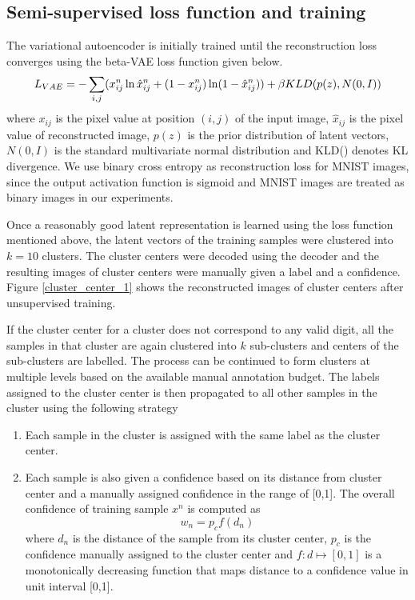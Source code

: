 \documentclass{bmvc2k}
\begin{document}
\subsection{Semi-supervised loss function and training}\label{section_loss_function}
The variational autoencoder is initially trained until the reconstruction loss converges using the beta-VAE loss function \cite{beta_vae} given below.
\begin{equation} \label{vae_loss_eqn}
L_{VAE} = -\sum_{i, j}(x_{ij}^n \ln \hat{x}_{ij}^n
+ (1 - x_{ij}^n) \ln(1 -  \hat{x}_{ij}^n ) )\\
    +\beta KLD(p(z), N(0,I))
\end{equation}
where   $x_{ij}$ is the pixel value at position $(i, j)$ of the input image, $\hat{x}_{ij}$ is the pixel value of reconstructed image, $p(z)$ is the prior distribution of latent vectors, $N(0,I)$ is the standard multivariate normal distribution and KLD() denotes KL divergence.
We use binary cross entropy as reconstruction loss for MNIST images, since the output activation function is sigmoid and MNIST images are treated as binary images in our experiments.

Once a reasonably good latent representation is learned using the loss function mentioned above, the latent vectors of the training samples were clustered into $k=10$ clusters.
The cluster centers were decoded using the decoder  and the resulting images of cluster centers were manually given a label and a confidence.
Figure \ref{cluster_center_1} shows the reconstructed images of cluster centers after unsupervised training.


If the cluster center for a cluster does not correspond to any valid digit, all the samples in that cluster are again clustered into $k$ sub-clusters and  centers of the sub-clusters are labelled.
The process can be continued to form clusters at multiple levels based on the available manual annotation budget.
The labels assigned to the cluster center is then propagated to all other samples in the cluster using the following strategy
\begin{enumerate}
    \item Each sample in the cluster is assigned with the  same label as the cluster center.
    \item Each sample is also given a confidence based on its distance from cluster center and  a manually assigned confidence in the range of [0,1]. The overall confidence of  training sample $x^n$ is computed as $$w_n = p_cf(d_n)$$
where $d_n$ is the distance of the sample from its cluster center, $p_c$  is the confidence manually assigned to the cluster center and $f: d \mapsto [0,1]$ is a monotonically decreasing function that maps distance to a confidence value in unit interval [0,1].
\end{enumerate}
\end{document}
